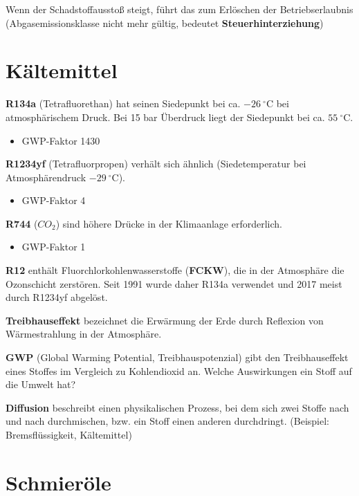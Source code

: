 Wenn der Schadstoffausstoß steigt, führt das zum Erlöschen der
Betriebserlaubnis (Abgasemissionsklasse nicht mehr gültig, bedeutet
\textbf{Steuerhinterziehung})

\section{Kältemittel}\label{kaeltemittel}

\textbf{R134a} (Tetrafluorethan) hat seinen Siedepunkt bei ca.
$-26~^\circ\text{C}$ bei atmosphärischem Druck. Bei 15 bar Überdruck
liegt der Siedepunkt bei ca. $55~^\circ\text{C}$.

\begin{itemize}
\item
  GWP-Faktor 1430
\end{itemize}

\textbf{R1234yf} (Tetrafluorpropen) verhält sich ähnlich
(Siedetemperatur bei Atmosphärendruck $-29~^\circ\text{C}$).

\begin{itemize}
\item
  GWP-Faktor 4
\end{itemize}

\textbf{R744} ($CO_2$) sind höhere Drücke in der Klimaanlage
erforderlich.

\begin{itemize}
\item
  GWP-Faktor 1
\end{itemize}

\textbf{R12} enthält Fluorchlorkohlenwasserstoffe (\textbf{FCKW}), die
in der Atmosphäre die Ozonschicht zerstören. Seit 1991 wurde daher R134a
verwendet und 2017 meist durch R1234yf abgelöst.

\textbf{Treibhauseffekt} bezeichnet die Erwärmung der Erde durch
Reflexion von Wärmestrahlung in der Atmosphäre.

\textbf{GWP} (Global Warming Potential, Treibhauspotenzial) gibt den
Treibhauseffekt eines Stoffes im Vergleich zu Kohlendioxid an. Welche
Auswirkungen ein Stoff auf die Umwelt hat?

\textbf{Diffusion} beschreibt einen physikalischen Prozess, bei dem sich
zwei Stoffe nach und nach durchmischen, bzw. ein Stoff einen anderen
durchdringt. (Beispiel: Bremsflüssigkeit, Kältemittel)

\section{Schmieröle}\label{schmieroele}

